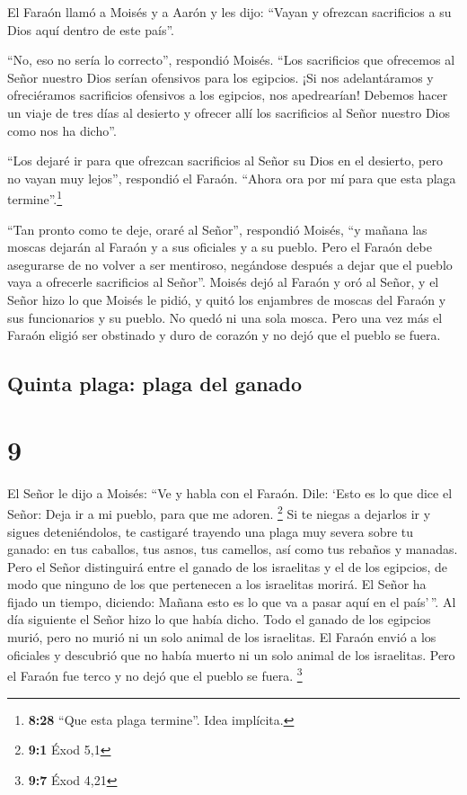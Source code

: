  El Faraón llamó a Moisés y a Aarón y les dijo: ``Vayan y
ofrezcan sacrificios a su Dios aquí dentro de este país''.

 ``No, eso no sería lo correcto'', respondió Moisés.
``Los sacrificios que ofrecemos al Señor nuestro Dios serían ofensivos
para los egipcios. ¡Si nos adelantáramos y ofreciéramos sacrificios
ofensivos a los egipcios, nos apedrearían!  Debemos hacer
un viaje de tres días al desierto y ofrecer allí los sacrificios al
Señor nuestro Dios como nos ha dicho''.

 ``Los dejaré ir para que ofrezcan sacrificios al Señor
su Dios en el desierto, pero no vayan muy lejos'', respondió el Faraón.
``Ahora ora por mí para que esta plaga termine''.\footnote{\textbf{8:28}
  ``Que esta plaga termine''. Idea implícita.}

 ``Tan pronto como te deje, oraré al Señor'', respondió
Moisés, ``y mañana las moscas dejarán al Faraón y a sus oficiales y a su
pueblo. Pero el Faraón debe asegurarse de no volver a ser mentiroso,
negándose después a dejar que el pueblo vaya a ofrecerle sacrificios al
Señor''.  Moisés dejó al Faraón y oró al Señor,
 y el Señor hizo lo que Moisés le pidió, y quitó los
enjambres de moscas del Faraón y sus funcionarios y su pueblo. No quedó
ni una sola mosca.  Pero una vez más el Faraón eligió ser
obstinado y duro de corazón y no dejó que el pueblo se fuera.

\hypertarget{quinta-plaga-plaga-del-ganado}{%
\subsection{Quinta plaga: plaga del
ganado}\label{quinta-plaga-plaga-del-ganado}}

\hypertarget{section-8}{%
\section{9}\label{section-8}}

 El Señor le dijo a Moisés: ``Ve y habla con el Faraón.
Dile: `Esto es lo que dice el Señor: Deja ir a mi pueblo, para que me
adoren. \footnote{\textbf{9:1} Éxod 5,1}  Si te niegas a
dejarlos ir y sigues deteniéndolos,  te castigaré trayendo
una plaga muy severa sobre tu ganado: en tus caballos, tus asnos, tus
camellos, así como tus rebaños y manadas.  Pero el Señor
distinguirá entre el ganado de los israelitas y el de los egipcios, de
modo que ninguno de los que pertenecen a los israelitas morirá.
 El Señor ha fijado un tiempo, diciendo: Mañana esto es lo
que va a pasar aquí en el país'\,''.  Al día siguiente el
Señor hizo lo que había dicho. Todo el ganado de los egipcios murió,
pero no murió ni un solo animal de los israelitas.  El
Faraón envió a los oficiales y descubrió que no había muerto ni un solo
animal de los israelitas. Pero el Faraón fue terco y no dejó que el
pueblo se fuera. \footnote{\textbf{9:7} Éxod 4,21}

